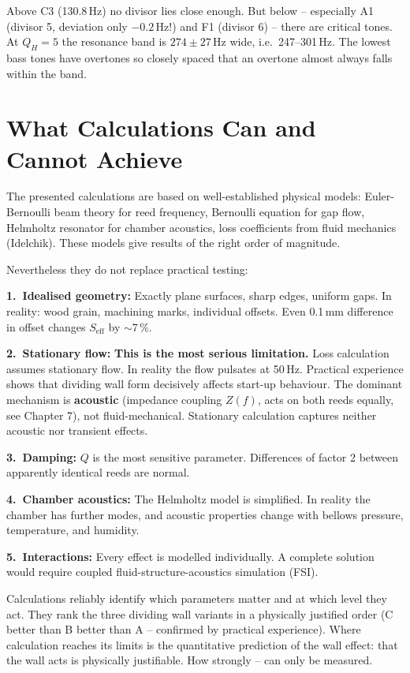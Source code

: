 \documentclass[11pt,a4paper]{article}
\begin{document}
Above C3 (130.8\,Hz) no divisor lies close enough. But below -- especially A1 (divisor 5, deviation only $-0.2$\,Hz!) and F1 (divisor 6) -- there are critical tones. At $Q_H = 5$ the resonance band is $274 \pm 27$\,Hz wide, i.e.\ 247--301\,Hz. The lowest bass tones have overtones so closely spaced that an overtone almost always falls within the band.

\section{What Calculations Can and Cannot Achieve}

The presented calculations are based on well-established physical models: Euler-Bernoulli beam theory for reed frequency, Bernoulli equation for gap flow, Helmholtz resonator for chamber acoustics, loss coefficients from fluid mechanics (Idelchik). These models give results of the right order of magnitude.

Nevertheless they do not replace practical testing:

\textbf{1.\ Idealised geometry:} Exactly plane surfaces, sharp edges, uniform gaps. In reality: wood grain, machining marks, individual offsets. Even 0.1\,mm difference in offset changes $S_\text{eff}$ by $\sim$7\,\%.

\textbf{2.\ Stationary flow:} \textbf{This is the most serious limitation.} Loss calculation assumes stationary flow. In reality the flow pulsates at 50\,Hz. Practical experience shows that dividing wall form decisively affects start-up behaviour. The dominant mechanism is \textbf{acoustic} (impedance coupling $Z(f)$, acts on both reeds equally, see Chapter 7), not fluid-mechanical. Stationary calculation captures neither acoustic nor transient effects.

\textbf{3.\ Damping:} $Q$ is the most sensitive parameter. Differences of factor 2 between apparently identical reeds are normal.

\textbf{4.\ Chamber acoustics:} The Helmholtz model is simplified. In reality the chamber has further modes, and acoustic properties change with bellows pressure, temperature, and humidity.

\textbf{5.\ Interactions:} Every effect is modelled individually. A complete solution would require coupled fluid-structure-acoustics simulation (FSI).

Calculations reliably identify which parameters matter and at which level they act. They rank the three dividing wall variants in a physically justified order (C better than B better than A -- confirmed by practical experience). Where calculation reaches its limits is the quantitative prediction of the wall effect: that the wall acts is physically justifiable. How strongly -- can only be measured.
\end{document}

